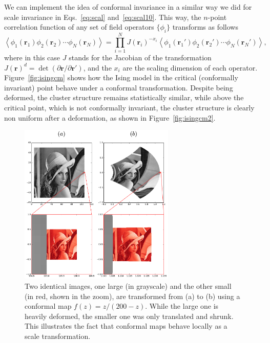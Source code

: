 We can implement the idea of conformal invariance in a similar way we did
for scale invariance in Eqs.~\ref{eq:scal} and~\ref{eq:scal10}.
This way, the $n$-point correlation function of any set of field
operators $\{\phi_i\}$ transforms as follows
\begin{equation}
    \label{eq:cinv}
    \left\langle
        \phi_{1}\left(\mathbf{r}_{1}\right)
        \phi_{2}\left(\mathbf{r}_{2}\right)
        \cdots
        \phi_{N}\left(\mathbf{r}_{N}\right)
    \right\rangle =
    \prod_{i=1}^{N}J{\left(\mathbf{r}_{i}\right)}^{-x_{i}}
    \left\langle
        \phi_{1}\left(\mathbf{r}_{1}'\right)
        \phi_{2}\left(\mathbf{r}_{2}'\right)
        \cdots
        \phi_{N}\left(\mathbf{r}_{N}'\right)
    \right\rangle,
\end{equation}
where in this case $J$ stands for the Jacobian of the transformation
$J{\left(\mathbf{r}\right)}^{d}=
\det\left(\partial\mathbf{r}/\partial\mathbf{r}'\right)$, and the $x_i$ are the
scaling dimension of each operator. Figure~\ref{fig:isingcm} shows how the Ising
model in the critical (conformally invariant) point behave under a conformal
transformation. Despite being deformed, the cluster structure remains
statistically similar, while above the critical point, which is not conformally
invariant, the cluster structure is clearly non uniform after a deformation, as
shown in Figure~\ref{fig:isingcm2}.

\begin{figure}
\begin{center}
    \includegraphics[width=0.66\textwidth]{chapters/ch3-conf/figs/lenna}
\end{center}
\caption{Two identical images, one large (in grayscale) and the other small (in
    red, shown in the zoom), are transformed from (a) to (b) using a conformal
    map $f(z)=z/(200-z)$. While the large one is heavily deformed, the smaller
    one was only translated and shrunk. This illustrates the fact that conformal
    maps behave locally as a scale transformation.}
\label{fig:lenna}
\end{figure}


